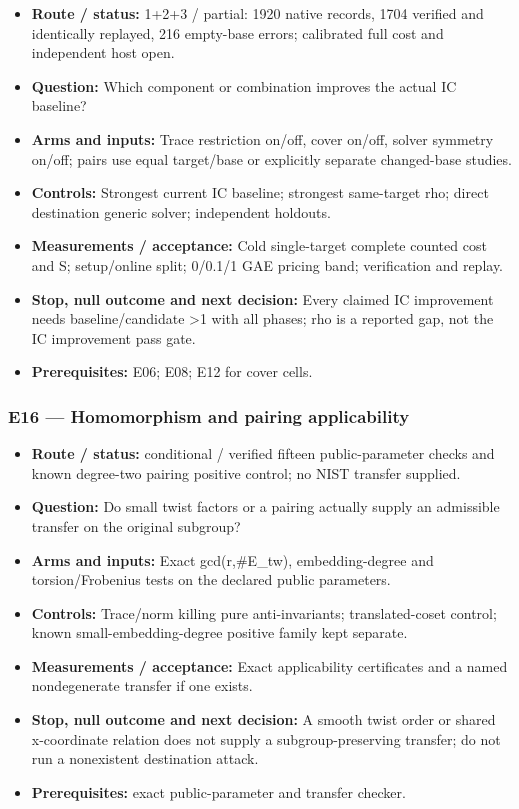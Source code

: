 \documentclass[
  10pt,
]{article}
\providecommand{\tightlist}{%
  \setlength{\itemsep}{0pt}\setlength{\parskip}{0pt}}
\begin{document}
\begin{itemize}
\tightlist
\item
  \textbf{Route / status:} 1+2+3 / partial: 1920 native records, 1704
  verified and identically replayed, 216 empty-base errors; calibrated
  full cost and independent host open.
\item
  \textbf{Question:} Which component or combination improves the actual
  IC baseline?
\item
  \textbf{Arms and inputs:} Trace restriction on/off, cover on/off,
  solver symmetry on/off; pairs use equal target/base or explicitly
  separate changed-base studies.
\item
  \textbf{Controls:} Strongest current IC baseline; strongest
  same-target rho; direct destination generic solver; independent
  holdouts.
\item
  \textbf{Measurements / acceptance:} Cold single-target complete
  counted cost and S; setup/online split; 0/0.1/1 GAE pricing band;
  verification and replay.
\item
  \textbf{Stop, null outcome and next decision:} Every claimed IC
  improvement needs baseline/candidate \textgreater1 with all phases;
  rho is a reported gap, not the IC improvement pass gate.
\item
  \textbf{Prerequisites:} E06; E08; E12 for cover cells.
\end{itemize}

\subsubsection{E16 --- Homomorphism and pairing
applicability}\label{e16-homomorphism-and-pairing-applicability}

\begin{itemize}
\tightlist
\item
  \textbf{Route / status:} conditional / verified fifteen
  public-parameter checks and known degree-two pairing positive control;
  no NIST transfer supplied.
\item
  \textbf{Question:} Do small twist factors or a pairing actually supply
  an admissible transfer on the original subgroup?
\item
  \textbf{Arms and inputs:} Exact gcd(r,\#E\_tw), embedding-degree and
  torsion/Frobenius tests on the declared public parameters.
\item
  \textbf{Controls:} Trace/norm killing pure anti-invariants;
  translated-coset control; known small-embedding-degree positive family
  kept separate.
\item
  \textbf{Measurements / acceptance:} Exact applicability certificates
  and a named nondegenerate transfer if one exists.
\item
  \textbf{Stop, null outcome and next decision:} A smooth twist order or
  shared x-coordinate relation does not supply a subgroup-preserving
  transfer; do not run a nonexistent destination attack.
\item
  \textbf{Prerequisites:} exact public-parameter and transfer checker.
\end{itemize}
\end{document}
